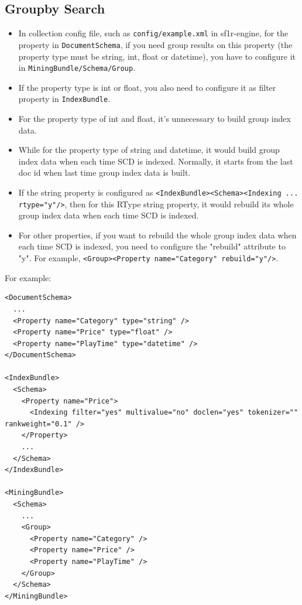 \subsection{Groupby Search}
\begin{itemize}
\item In collection config file, such as \verb!config/example.xml! in sf1r-engine, for the property in \verb!DocumentSchema!,
if you need group results on this property (the property type must be string, int, float or datetime),
you have to configure it in \verb!MiningBundle/Schema/Group!.

\item If the property type is int or float, you also need to configure it as filter property in \verb!IndexBundle!.

\item For the property type of int and float, it's unnecessary to build group index data.

\item While for the property type of string and datetime, it would build group index data when each time SCD is indexed.
Normally, it starts from the last doc id when last time group index data is built.

\item If the string property is configured as \verb!<IndexBundle><Schema><Indexing ... rtype="y"/>!,
then for this RType string property, it would rebuild its whole group index data when each time SCD is indexed.

\item For other properties, if you want to rebuild the whole group index data when each time SCD is indexed,
you need to configure the "rebuild" attribute to "y". For example, \verb!<Group><Property name="Category" rebuild="y"/>!.

\end{itemize}

For example:

\begin{lstlisting}
<DocumentSchema>
  ...
  <Property name="Category" type="string" />
  <Property name="Price" type="float" />
  <Property name="PlayTime" type="datetime" />
</DocumentSchema>

<IndexBundle>
  <Schema>
    <Property name="Price">
      <Indexing filter="yes" multivalue="no" doclen="yes" tokenizer="" rankweight="0.1" />
    </Property>
    ...
  </Schema>
</IndexBundle>

<MiningBundle>
  <Schema>
    ...
    <Group>
      <Property name="Category" />
      <Property name="Price" />
      <Property name="PlayTime" />
    </Group>
  </Schema>
</MiningBundle>
\end{lstlisting}

